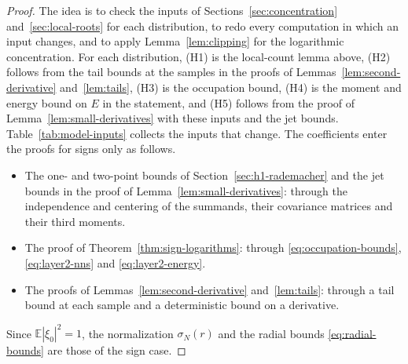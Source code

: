 \begin{proof}
The idea is to check the inputs of Sections~\ref{sec:concentration}
and~\ref{sec:local-roots} for each distribution, to redo every
computation in which an input changes, and to apply
Lemma~\ref{lem:clipping} for the logarithmic concentration.
For each distribution, (H1) is the local-count lemma above, (H2)
follows from the tail bounds at the samples in the proofs of
Lemmas~\ref{lem:second-derivative} and~\ref{lem:tails}, (H3) is the
occupation bound, (H4) is the moment and energy bound on $E$ in the
statement, and (H5) follows from the proof of
Lemma~\ref{lem:small-derivatives} with these inputs and the jet bounds.
Table~\ref{tab:model-inputs} collects the inputs that change.
The coefficients enter the proofs for signs only as follows.
\begin{itemize}
\item The one- and two-point bounds of Section~\ref{sec:h1-rademacher}
 and the jet bounds in the proof of Lemma~\ref{lem:small-derivatives}:
 through the independence and centering of the summands, their
 covariance matrices and their third moments.
\item The proof of Theorem~\ref{thm:sign-logarithms}: through
 \eqref{eq:occupation-bounds}, \eqref{eq:layer2-nns} and
 \eqref{eq:layer2-energy}.
\item The proofs of Lemmas~\ref{lem:second-derivative}
 and~\ref{lem:tails}: through a tail bound at each sample and a
 deterministic bound on a derivative.
\end{itemize}
Since $\mathbb E|\xi_0|^2=1$, the normalization $\sigma_N(r)$ and the
radial bounds \eqref{eq:radial-bounds} are those of the sign case.


\end{proof}

